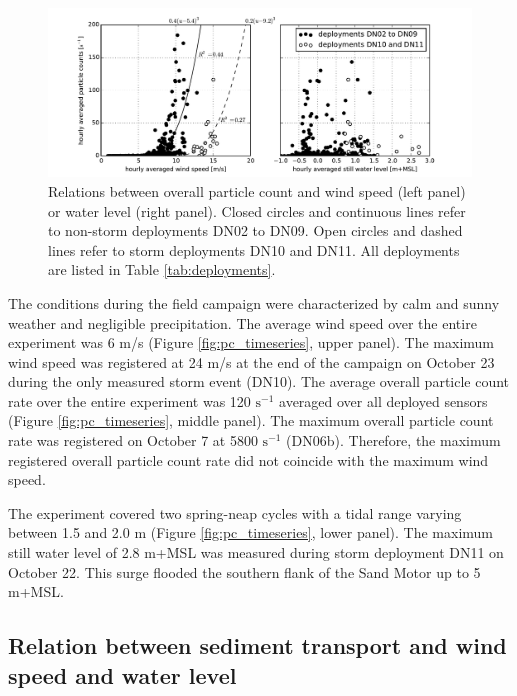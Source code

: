 \begin{figure}
 \centering
  \includegraphics[width=\columnwidth]{../Figures/particlecounts_correlations}
  \caption{Relations between overall particle count and wind speed
    (left panel) or water level (right panel). Closed circles and
    continuous lines refer to non-storm deployments DN02 to DN09. Open
    circles and dashed lines refer to storm deployments DN10 and
    DN11. All deployments are listed in Table \ref{tab:deployments}.}
  \label{fig:pc_correlations}
\end{figure}

The conditions during the field campaign were characterized by calm
and sunny weather and negligible precipitation. The average wind speed
over the entire experiment was 6 m/s (Figure \ref{fig:pc_timeseries},
upper panel). The maximum wind speed was registered at 24 m/s at the
end of the campaign on October 23 during the only measured storm event
(DN10). The average overall particle count rate over the entire
experiment was 120 $\mathrm{s^{-1}}$ averaged over all deployed
sensors (Figure \ref{fig:pc_timeseries}, middle panel). The maximum
overall particle count rate was registered on October 7 at 5800
$\mathrm{s^{-1}}$ (DN06b). Therefore, the maximum registered overall
particle count rate did not coincide with the maximum wind speed.

The experiment covered two spring-neap cycles with a tidal range
varying between 1.5 and 2.0 m (Figure \ref{fig:pc_timeseries}, lower
panel). The maximum still water level of 2.8 m+MSL was measured during
storm deployment DN11 on October 22. This surge flooded the southern
flank of the Sand Motor up to 5 m+MSL.

\subsection{Relation between sediment transport and wind speed and
  water level}

